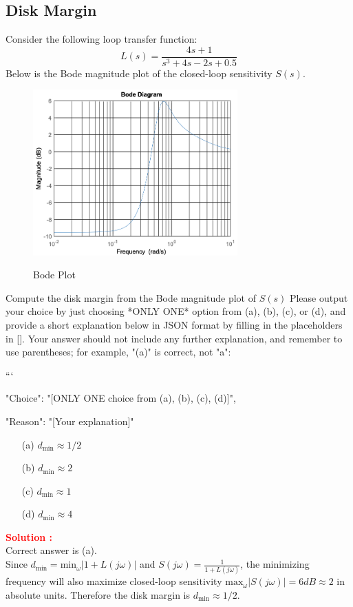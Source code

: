 \documentclass[12pt]{article}
\begin{document}
\subsection{Disk Margin}

Consider the following loop transfer function:
\begin{equation}
    L(s)  = \frac{4s+1}{s^3 + 4s - 2s + 0.5}
\end{equation}
Below is the Bode magnitude plot of the closed-loop sensitivity $S(s)$. 

\begin{figure}[h]
        \centering
        \includegraphics[width=0.7\textwidth]{figs/6.6.png}
        \label{fig:nyquist_92}
        \caption{Bode Plot}
\end{figure}

Compute the disk margin from the Bode magnitude plot of $S(s)$ 
Please output your choice by just choosing *ONLY ONE* option from (a), (b), (c), or (d), and provide a short explanation below in JSON format by filling in the placeholders in []. Your answer should not include any further explanation, and remember to use parentheses; for example, "(a)" is correct, not "a":

```
{

"Choice": "[ONLY ONE choice from (a), (b), (c), (d)]",

"Reason": "[Your explanation]"

}

\begin{itemize}
    \item[(a)] \(d_{\text{min}} \approx  1/2\)
    \item[(b)] \(d_{\text{min}} \approx  2\)
    \item[(c)] \(d_{\text{min}} \approx  1\)
    \item[(d)] \(d_{\text{min}} \approx  4\)
\end{itemize}
\textbf{\textcolor{red}{Solution :}}\\
Correct answer is (a).\\
Since $d_{\text{min}} = \text{min}_{\omega} | 1 + L(j \omega) | $ and $S(j \omega) = \frac{1}{1 + L(j\omega)}$, the minimizing frequency will also maximize closed-loop sensitivity $\text{max}_\omega |S(j\omega)| = 6 dB \approx 2$ in absolute units. Therefore the disk margin is $d_{\text{min}} \approx  1/2$.
\clearpage
\end{document}
